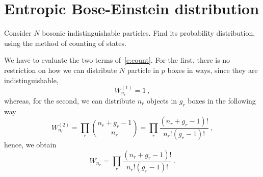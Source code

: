 \section{Entropic Bose-Einstein distribution}

    \begin{exercise}
        Consider $N$ bosonic indistinguishable particles. Find its probability distribution, using the method of counting of states.
    \end{exercise}
    
    We have to evaluate the two terms of~\eqref{e:count}. For the first, there is no restriction on how we can distribute $N$ particle in $p$ boxes in ways, since they are indistinguishable,
    \begin{equation*}
        W^{(1)}_{n_r} = 1 ~,
    \end{equation*}
    whereas, for the second, we can distribute $n_r$ objects in $g_r$ boxes in the following way
    \begin{equation*}
        W^{(2)}_{n_r} = \prod_r \binom{n_r + g_r - 1}{n_r} = \prod_r \frac{(n_r + g_r - 1)!}{n_r! (g_r - 1)!} ~,
    \end{equation*}
    hence, we obtain
    \begin{equation*}
        W_{n_r} = \prod_r \frac{(n_r + g_r - 1)!}{n_r! (g_r - 1)!} ~.
    \end{equation*}
    
